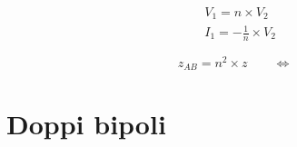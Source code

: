 \documentclass{article}
\begin{document}
        \begin{minipage}[t]{.1\textwidth}
            \vspace{-\baselineskip}

            

        \end{minipage}
        \hfill
        \begin{minipage}[t]{.1\textwidth}
            \vspace{-\baselineskip}
            \vspace{.4cm}

            \begin{align*}
                &V_1 = n \times V_2\\
                &I_1 = -\frac{1}{n} \times V_2
            \end{align*}

        \end{minipage}
        \hfill
        \begin{minipage}[t]{.1\textwidth}
            \vspace{-\baselineskip}

            

        \end{minipage}
        \hfill
        \begin{minipage}[t]{.1\textwidth}
            \vspace{.3cm}

            \[
                z_{AB} = n^2 \times z \qquad \iff
            \]

        \end{minipage}
        \hfill
        \begin{minipage}[t]{.1\textwidth}
            \vspace{-\baselineskip}
            \vspace{.7cm}

            

        \end{minipage}

    \vspace{-1.5\baselineskip}
    \section*{Doppi bipoli}
\end{document}
